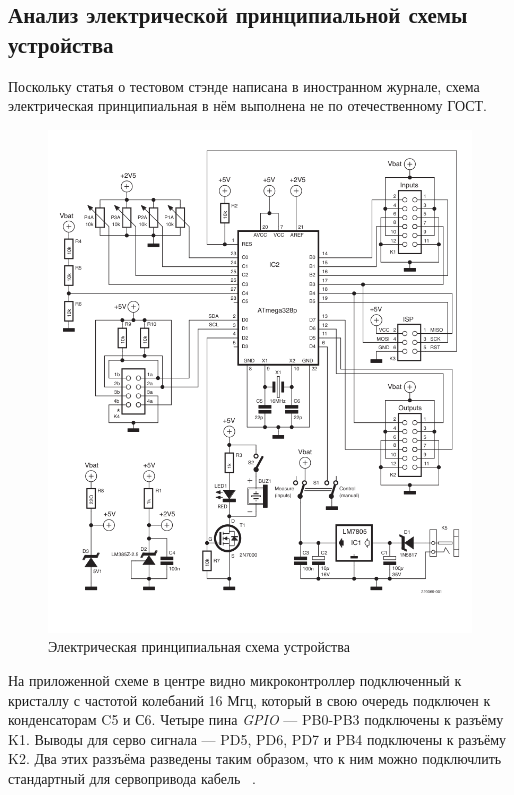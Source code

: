 \subsection{Анализ электрической принципиальной схемы устройства}

Поскольку статья о тестовом стэнде написана в иностранном журнале, схема электрическая принципиальная в нём выполнена не по отечественному ГОСТ.

\begin{figure}[h]
  \centering
  \includegraphics[scale = 0.60]{../img/scrot/Screenshot-2024-05-15-193101.png}
  \caption{Электрическая принципиальная схема устройства}
\end{figure}

На приложенной схеме в центре видно микроконтроллер подключенный к кристаллу с частотой колебаний 16 Мгц, который в свою очередь подключен к конденсаторам C5 и С6. Четыре пина \textit{GPIO} — PB0-PB3 подключены  к разъёму K1. Выводы для серво сигнала — PD5, PD6, PD7 и PB4 подключены к разъёму K2. Два этих раззъёма разведены таким образом, что к ним можно подключлить стандартный для сервопривода кабель ~\cite{Elector521}.

